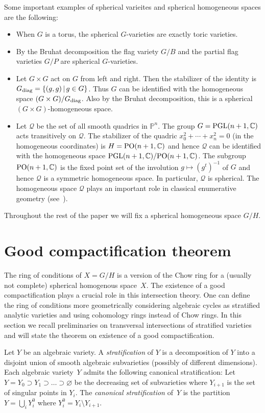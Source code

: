 \documentclass[10pt,a4paper]{amsart}
\def \C{\mathbb{C}}
\def \p{\mathbb{P}}
\numberwithin{equation}{section}
\theoremstyle{definition}
\begin{document}
Some important examples of spherical varieites and spherical homogeneous spaces are the following:
\begin{itemize}\itemsep=0pt
\item[(1)] When $G$ is a torus, the spherical $G$-varieties are exactly toric varieties.
\item[(2)] By the Bruhat decomposition the flag variety $G/B$ and the partial flag varieties $G/P$ are spherical $G$-varieties.
\item[(3)] Let $G \times G$ act on $G$ from left and right. Then the stabilizer of the identity is $G_{{\rm diag}} = \{(g, g) \,|\, g \in G\}$. Thus $G$ can be identified with the homogeneous space $(G \times G) / G_{{\rm diag}}$. Also by the Bruhat decomposition, this is a spherical $(G \times G)$-homogeneous space.
\item[(4)] Let $\mathcal{Q}$ be the set of all smooth quadrics in $\p^n$. The group $G = {\rm PGL}(n+1,\C)$ acts transitively on $\mathcal{Q}$.
The stabilizer of the quadric $x_0^2 + \cdots + x_n^2 = 0$ (in the homogeneous coordinates) is $H = {\rm PO}(n+1, \C)$ and hence $\mathcal{Q}$ can be identified with the
homogeneous space ${\rm PGL}(n+1, \C) / {\rm PO}(n+1, \C)$. The subgroup ${\rm PO}(n+1,\C)$ is the fixed point set of the involution $g \mapsto (g^t)^{-1}$ of $G$ and hence
$\mathcal{Q}$ is a symmetric homogeneous space. In particular, $\mathcal{Q}$ is spherical.
The homogeneous space $\mathcal{Q}$ plays an important role in classical enumerative geometry (see~\cite{DP}).
\end{itemize}

Throughout the rest of the paper we will fix a spherical homogeneous space $G/H$.

\section{Good compactification theorem} \label{sec-good- compactification}
The ring of conditions of $X=G/H$ is a version of the Chow ring for a (usually not complete) spherical homogenous space~$X$. The existence of a good compactification plays a crucial role in this intersection theory. One can define the ring of conditions more geometrically considering algebraic cycles as stratified analytic varieties and using cohomology rings instead of Chow rings. In this section we recall preliminaries on transversal intersections of stratified varieties and will state the theorem on existence of a good compactification.

Let $Y$ be an algebraic variety. A {\it stratification} of $Y$ is a decomposition of $Y$ into a disjoint union of smooth algebraic subvarieties (possibly of different dimensions). Each algebraic variety~$Y$ admits the following canonical stratification: Let $Y=Y_0\supset Y_1\supset\dots \supset \varnothing$ be the decreasing set of subvarieties where $Y_{i+1}$ is the set of singular points in $Y_i$. The {\it canonical stratification} of~$Y$ is the partition $Y=\bigcup_i Y_i^0$ where $Y_i^0=Y_i\setminus Y_{i+1}.$
\end{document}
